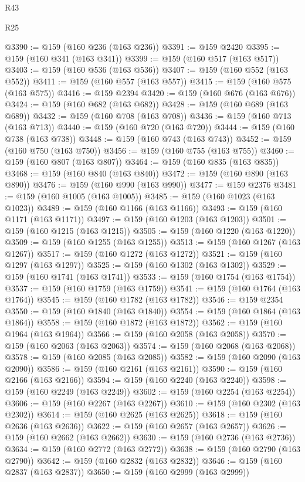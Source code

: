 \begin{lexlean}{R43}
\begin{lexlean}{R25}
\begin{coremodule}
{{{{{{{{{{{{{{{{{{{{{{{{{{{{{{{{{{{{{{{{{{{{{{{{{{{{{{{{{{{{{{{{{{{{{{{{{{{{{{{{{{{{{{{{{{{{{{{{{{{{{{{{{{{{{{{{{{{{{{{{{{{{{{{{{{{{{{{{{{{{{{{{{{{{{{{{{{{{{{{{{{{{{{{{{{{{{{{{{{{{{{{{{{{{{{{{{@3390 := @159 (@160 @236 (@163 @236))
@3391 := @159 @2420
@3395 := @159 (@160 @341 (@163 @341))
@3399 := @159 (@160 @517 (@163 @517))
@3403 := @159 (@160 @536 (@163 @536))
@3407 := @159 (@160 @552 (@163 @552))
@3411 := @159 (@160 @557 (@163 @557))
@3415 := @159 (@160 @575 (@163 @575))
@3416 := @159 @2394
@3420 := @159 (@160 @676 (@163 @676))
@3424 := @159 (@160 @682 (@163 @682))
@3428 := @159 (@160 @689 (@163 @689))
@3432 := @159 (@160 @708 (@163 @708))
@3436 := @159 (@160 @713 (@163 @713))
@3440 := @159 (@160 @720 (@163 @720))
@3444 := @159 (@160 @738 (@163 @738))
@3448 := @159 (@160 @743 (@163 @743))
@3452 := @159 (@160 @750 (@163 @750))
@3456 := @159 (@160 @755 (@163 @755))
@3460 := @159 (@160 @807 (@163 @807))
@3464 := @159 (@160 @835 (@163 @835))
@3468 := @159 (@160 @840 (@163 @840))
@3472 := @159 (@160 @890 (@163 @890))
@3476 := @159 (@160 @990 (@163 @990))
@3477 := @159 @2376
@3481 := @159 (@160 @1005 (@163 @1005))
@3485 := @159 (@160 @1023 (@163 @1023))
@3489 := @159 (@160 @1166 (@163 @1166))
@3493 := @159 (@160 @1171 (@163 @1171))
@3497 := @159 (@160 @1203 (@163 @1203))
@3501 := @159 (@160 @1215 (@163 @1215))
@3505 := @159 (@160 @1220 (@163 @1220))
@3509 := @159 (@160 @1255 (@163 @1255))
@3513 := @159 (@160 @1267 (@163 @1267))
@3517 := @159 (@160 @1272 (@163 @1272))
@3521 := @159 (@160 @1297 (@163 @1297))
@3525 := @159 (@160 @1302 (@163 @1302))
@3529 := @159 (@160 @1741 (@163 @1741))
@3533 := @159 (@160 @1754 (@163 @1754))
@3537 := @159 (@160 @1759 (@163 @1759))
@3541 := @159 (@160 @1764 (@163 @1764))
@3545 := @159 (@160 @1782 (@163 @1782))
@3546 := @159 @2354
@3550 := @159 (@160 @1840 (@163 @1840))
@3554 := @159 (@160 @1864 (@163 @1864))
@3558 := @159 (@160 @1872 (@163 @1872))
@3562 := @159 (@160 @1964 (@163 @1964))
@3566 := @159 (@160 @2058 (@163 @2058))
@3570 := @159 (@160 @2063 (@163 @2063))
@3574 := @159 (@160 @2068 (@163 @2068))
@3578 := @159 (@160 @2085 (@163 @2085))
@3582 := @159 (@160 @2090 (@163 @2090))
@3586 := @159 (@160 @2161 (@163 @2161))
@3590 := @159 (@160 @2166 (@163 @2166))
@3594 := @159 (@160 @2240 (@163 @2240))
@3598 := @159 (@160 @2249 (@163 @2249))
@3602 := @159 (@160 @2254 (@163 @2254))
@3606 := @159 (@160 @2267 (@163 @2267))
@3610 := @159 (@160 @2302 (@163 @2302))
@3614 := @159 (@160 @2625 (@163 @2625))
@3618 := @159 (@160 @2636 (@163 @2636))
@3622 := @159 (@160 @2657 (@163 @2657))
@3626 := @159 (@160 @2662 (@163 @2662))
@3630 := @159 (@160 @2736 (@163 @2736))
@3634 := @159 (@160 @2772 (@163 @2772))
@3638 := @159 (@160 @2790 (@163 @2790))
@3642 := @159 (@160 @2832 (@163 @2832))
@3646 := @159 (@160 @2837 (@163 @2837))
@3650 := @159 (@160 @2999 (@163 @2999))
}}}}}}}}}}}}}}}}}}}}}}}}}}}}}}}}}}}}}}}}}}}}}}}}}}}}}}}}}}}}}}}}}}}}}}}}}}}}}}}}}}}}}}}}}}}}}}}}}}}}}}}}}}}}}}}}}}}}}}}}}}}}}}}}}}}}}}}}}}}}}}}}}}}}}}}}}}}}}}}}}}}}}}}}}}}}}}}}}}}}}}}}}}}}}}}}}
\end{coremodule}
\end{lexlean}
\end{lexlean}
